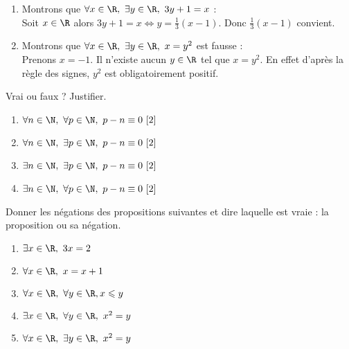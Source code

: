 \documentclass[a4paper,12pt,french]{book}
\begin{document}
\begin{exemple}[s]
	\begin{enumerate}[\textbullet]
		\item 	Montrons que $\forall x \in \R,\ \exists y\in \R,\ 3y+1=x$ :\\
				Soit $x\in\R$ alors $3y+1=x\Leftrightarrow y=\frac{1}{3}(x-1)$. Donc  $\frac{1}{3}(x-1)$ convient.
		\item 	Montrons que $\forall x\in\R,\ \exists y\in\R,\ x=y^2$ est fausse :\\
		 		Prenons $x=-1$. Il n'existe aucun $y\in\R$ tel que $x=y^2$. En effet d'après la règle des signes, $y^2$ est obligatoirement positif.
	\end{enumerate}
\end{exemple}

\begin{exercice}[]
	Vrai ou faux ? Justifier.
	\begin{enumerate}[\textbullet]
		\item 	$\forall n \in \N,\ \forall p \in \N,\ p-n \equiv 0\ [2]$
		\item 	$\forall n \in \N,\ \exists p \in \N,\ p-n \equiv 0\ [2]$
		\item 	$\exists n \in \N,\ \exists p \in \N,\ p-n \equiv 0\ [2]$
		\item 	$\exists n \in \N,\ \forall p \in \N,\ p-n \equiv 0\ [2]$
	\end{enumerate}
\end{exercice}

\begin{exercice}[]
	Donner les négations des propositions suivantes et dire laquelle est vraie : la proposition ou sa négation.
	\begin{enumerate}[\textbullet]
		\item 	$\exists x\in\R,\ 3x=2$
		\item 	$\forall x\in\R,\ x=x+1$
		\item 	$\forall x\in\R,\ \forall y\in\R, x\leqslant y$
		\item 	$\exists x\in\R,\ \forall y\in\R,\ x^2=y$
		\item 	$\forall x\in\R,\ \exists y\in\R,\ x^2=y$	
	\end{enumerate}
\end{exercice}
\end{document}
